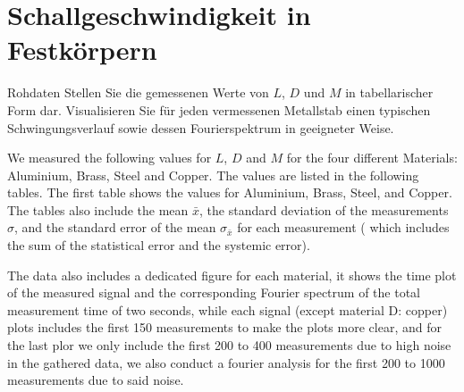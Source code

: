 \section{Schallgeschwindigkeit in Festkörpern}

\begin{aufgabe}{Rohdaten}
  Stellen Sie die gemessenen Werte von $L$, $D$ und $M$ in
  tabellarischer Form dar. Visualisieren Sie für jeden vermessenen
  Metallstab einen typischen Schwingungsverlauf sowie dessen
  Fourierspektrum in geeigneter Weise.
\end{aufgabe}


We measured the following values for $L$, $D$ and $M$ for the four different Materials: Aluminium, Brass, Steel and Copper. The values are listed in the following tables. The first table shows the values for Aluminium, Brass, Steel, and Copper.
The tables also include the mean $\bar{x}$, the standard deviation of the measurements $\sigma$,
and the standard error of the mean $\sigma_{\bar{x}}$ for each measurement ( which includes the 
sum of the statistical error and the systemic error).

\vspace{1em}

The data also includes a dedicated figure for each material, it shows the time plot of 
the measured signal and the corresponding Fourier spectrum of the total measurement time of two 
seconds, while each signal (except material D: copper) plots includes the first 150 measurements to make the plots more
clear, and for the last plor we only include the first 200 to 400 measurements due to high
noise in the gathered data, we also conduct a fourier analysis for the first 200 to 1000
measurements due to said noise. 

